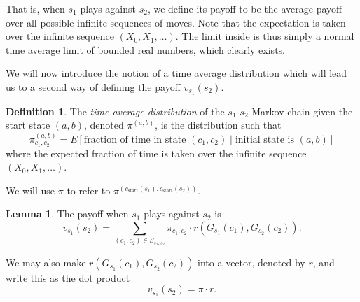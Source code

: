 \documentclass[11pt]{amsart}
\theoremstyle{definition}
\newtheorem{definition}[theorem]{Definition}
\newtheorem{lemma}[theorem]{Lemma}
\theoremstyle{remark}
\begin{document}
That is, when $s_1$ plays against $s_2$, we define its payoff to be the average payoff over all possible infinite sequences of moves. Note that the expectation is taken over the infinite sequence $(X_0, X_1, \ldots)$. The limit inside is thus simply a normal time average limit of bounded real numbers, which clearly exists. 

We will now introduce the notion of a time average distribution which will lead us to a second way of defining the payoff $v_{s_1}(s_2)$. 

\begin{definition}
  \label{timeaveragedistribution}
  The \textit{time average distribution} of the $s_1$-$s_2$ Markov chain given the start state $(a, b)$, denoted $\pi^{(a, b)}$, is the distribution such that \begin{equation*}
    \pi_{c_1, c_2}^{(a, b)} = E \left[ \text{fraction of time in state $(c_1,c_2)$} \mid \text{initial state is } (a, b)  \right]
  \end{equation*}
  where the expected fraction of time is taken over the infinite sequence $(X_0, X_1, \ldots)$.
\end{definition}

We will use $\pi$ to refer to $\pi^{(c_{\text{start}}(s_1), c_\text{start}(s_2))}$.

\begin{lemma}
  \label{payofftimeaverage}
  The payoff when $s_1$ plays against $s_2$ is
  \begin{equation*}
    v_{s_1}(s_2) = \sum_{(c_1,c_2) \in S_{s_1,s_2}} \pi_{c_1,c_2} \cdot r(G_{s_1}(c_1),G_{s_2}(c_2)).
  \end{equation*}
\end{lemma}

We may also make $r(G_{s_1}(c_1),G_{s_2}(c_2))$ into a vector, denoted by $r$, and write this as the dot product \begin{equation*}
  v_{s_1}(s_2) = \pi \cdot r.
\end{equation*}

\end{document}
